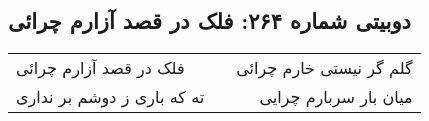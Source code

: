 \begin{center}
\section*{دوبیتی شماره ۲۶۴: فلک در قصد آزارم چرائی}
\label{sec:264}
\begin{longtable}{l p{0.5cm} r}
فلک در قصد آزارم چرائی
&&
گلم گر نیستی خارم چرائی
\\
ته که باری ز دوشم بر نداری
&&
میان بار سربارم چرایی
\\
\end{longtable}
\end{center}
